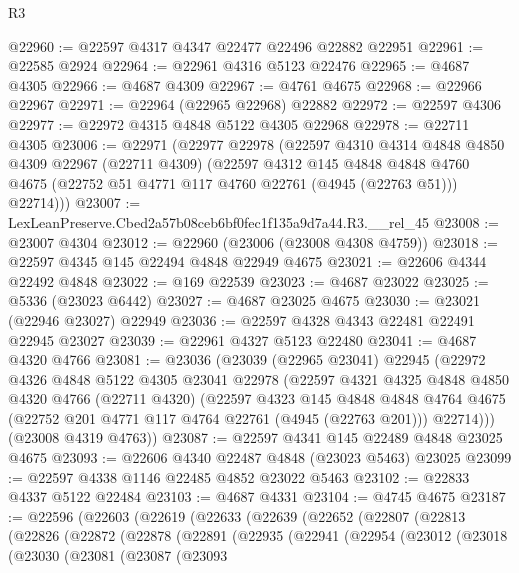 \begin{lexlean}{R3}
\begin{coremodule}
@22960 := @22597 @4317 @4347 @22477 @22496 @22882 @22951
@22961 := @22585 @2924
@22964 := @22961 @4316 @5123 @22476
@22965 := @4687 @4305
@22966 := @4687 @4309
@22967 := @4761 @4675
@22968 := @22966 @22967
@22971 := @22964 (@22965 @22968) @22882
@22972 := @22597 @4306
@22977 := @22972 @4315 @4848 @5122 @4305 @22968
@22978 := @22711 @4305
@23006 := @22971
    (@22977
      @22978
      (@22597
        @4310
        @4314
        @4848
        @4850
        @4309
        @22967
        (@22711 @4309)
        (@22597
          @4312
          @145
          @4848
          @4848
          @4760
          @4675
          (@22752 @51 @4771 @117 @4760 @22761 (@4945 (@22763 @51)))
          @22714)))
@23007 := LexLeanPreserve.Cbed2a57b08ceb6bf0fec1f135a9d7a44.R3.__rel_45
@23008 := @23007 @4304
@23012 := @22960 (@23006 (@23008 @4308 @4759))
@23018 := @22597 @4345 @145 @22494 @4848 @22949 @4675
@23021 := @22606 @4344 @22492 @4848
@23022 := @169 @22539
@23023 := @4687 @23022
@23025 := @5336 (@23023 @6442)
@23027 := @4687 @23025 @4675
@23030 := @23021 (@22946 @23027) @22949
@23036 := @22597 @4328 @4343 @22481 @22491 @22945 @23027
@23039 := @22961 @4327 @5123 @22480
@23041 := @4687 @4320 @4766
@23081 := @23036
    (@23039
      (@22965 @23041)
      @22945
      (@22972
        @4326
        @4848
        @5122
        @4305
        @23041
        @22978
        (@22597
          @4321
          @4325
          @4848
          @4850
          @4320
          @4766
          (@22711 @4320)
          (@22597
            @4323
            @145
            @4848
            @4848
            @4764
            @4675
            (@22752 @201 @4771 @117 @4764 @22761 (@4945 (@22763 @201)))
            @22714)))
      (@23008 @4319 @4763))
@23087 := @22597 @4341 @145 @22489 @4848 @23025 @4675
@23093 := @22606 @4340 @22487 @4848 (@23023 @5463) @23025
@23099 := @22597 @4338 @1146 @22485 @4852 @23022 @5463
@23102 := @22833 @4337 @5122 @22484
@23103 := @4687 @4331
@23104 := @4745 @4675
@23187 := @22596
    (@22603
      (@22619
        (@22633
          (@22639
            (@22652
              (@22807
                (@22813
                  (@22826
                    (@22872
                      (@22878
                        (@22891
                          (@22935
                            (@22941
                              (@22954
                                (@23012
                                  (@23018
                                    (@23030
                                      (@23081
                                        (@23087
                                          (@23093

\end{coremodule}
\end{lexlean}
